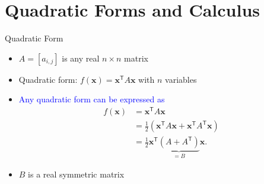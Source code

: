 \documentclass[aspectratio=169,hyperref,UTF8,CJK]{beamer}
\newcommand{\trans}{\mathsf{T}}
\newcommand{\vect}[1]{\boldsymbol{#1}}
\begin{document}
\section{Quadratic Forms and Calculus}

\begin{frame}{Quadratic Form}
  \begin{itemize}
    \item $A=[a_{i,j}]$ is any real $n\times n$ matrix
    \item Quadratic form: $f(\vect{x})=\vect{x}^{\trans}A\vect{x}$ with $n$ variables
    \item \textcolor{blue}{Any quadratic form can be expressed as}
      \begin{align*}
        f(\vect{x})&=\vect{x}^{\trans}A\vect{x}\\
        &=\frac{1}{2}\left(\vect{x}^{\trans}A\vect{x}+\vect{x}^{\trans}A^{\trans}\vect{x}\right)\\
        &=\frac{1}{2}\vect{x}^{\trans}\underbrace{(A+A^{\trans})}_{=B}\vect{x}.
      \end{align*}
    \item $B$ is a real symmetric matrix
  \end{itemize}
\end{frame}
\end{document}
